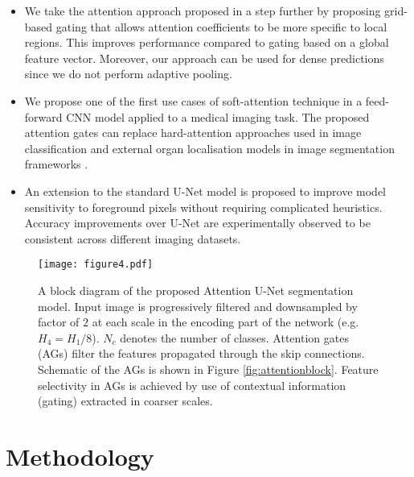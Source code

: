 \documentclass{article}
\begin{document}
\begin{itemize}
	
	\item We take the attention approach proposed in \cite{jetley2018learn} a step further by proposing grid-based gating that allows attention coefficients to be more specific to local regions. This improves performance compared to gating based on a global feature vector. Moreover, our approach can be used for dense predictions since we do not perform adaptive pooling.  
	
	\item We propose one of the first use cases of soft-attention technique in a feed-forward CNN model applied to a medical imaging task. The proposed attention gates can replace hard-attention approaches used in image classification \cite{ypsilantis2017learning} and external organ localisation models in image segmentation frameworks \cite{khened2018fully, oda20173d, roth2018media, roth2017hierarchical}. 
	
	\item An extension to the standard U-Net model is proposed to improve model sensitivity to foreground pixels without requiring complicated heuristics. Accuracy improvements over U-Net are experimentally observed to be consistent across different imaging datasets. 
\end{itemize}

\begin{figure}[!t]
	\centering
	\texttt{[image: figure4.pdf]}
	\caption{A block diagram of the proposed Attention U-Net segmentation model. Input image is progressively filtered and downsampled by factor of $2$ at each scale in the encoding part of the network (e.g. $H_4=H_1/8$). $N_c$ denotes the number of classes. Attention gates (AGs) filter the features propagated through the skip connections. Schematic of the AGs is shown in Figure \ref{fig:attentionblock}. Feature selectivity in AGs is achieved by use of contextual information (gating) extracted in coarser scales.}
	\label{fig:modelschematic}
\end{figure}

\section{Methodology}
\end{document}
